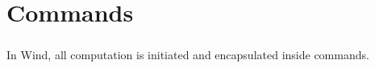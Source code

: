 
\chapter{Commands}

\paragraph{  } In Wind, all computation is initiated and encapsulated inside commands.